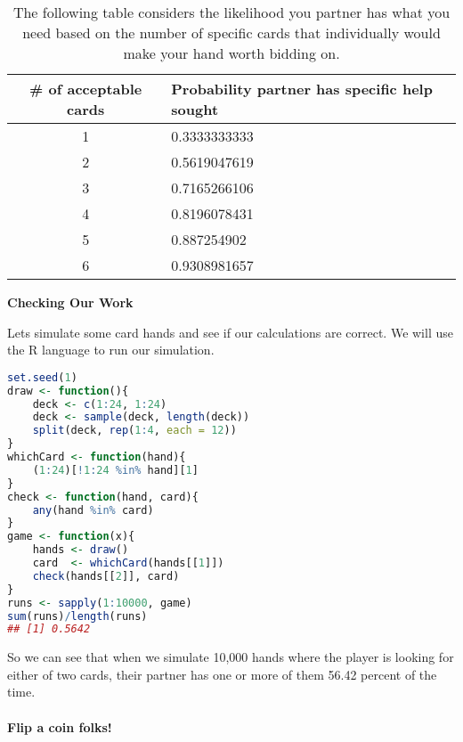 \documentclass[11pt]{article}
\begin{document}
\begin{table}[]
  \caption{The following table considers the likelihood you partner has what you need based on the number of specific cards that individually would make your hand worth bidding on.}
  \centering
\begin{tabular}{|c|l|}
\hline
\# of acceptable cards & Probability partner has specific help sought \\ \hline
1                      & 0.3333333333 \\ \hline
2                      & 0.5619047619 \\ \hline
3                      & 0.7165266106 \\ \hline
4                      & 0.8196078431 \\ \hline
5                      & 0.887254902  \\ \hline
6                      & 0.9308981657 \\ \hline
\end{tabular}
\end{table}

\begin{center}
  \textbf{Checking Our Work}
\end{center}
Lets simulate some card hands and see if our calculations are correct.
We will use the R language to run our simulation.
\begin{lstlisting}[language=R]
set.seed(1)
draw <- function(){
    deck <- c(1:24, 1:24)
    deck <- sample(deck, length(deck))
    split(deck, rep(1:4, each = 12))
}
whichCard <- function(hand){
    (1:24)[!1:24 %in% hand][1]
}
check <- function(hand, card){
    any(hand %in% card)
}
game <- function(x){
    hands <- draw()
    card  <- whichCard(hands[[1]])
    check(hands[[2]], card)
}
runs <- sapply(1:10000, game)
sum(runs)/length(runs)
## [1] 0.5642
\end{lstlisting}
So we can see that when we simulate 10,000 hands where the player is looking for either of two cards, their partner has one or more of them 56.42 percent of the time.\\
\\
\textbf{Flip a coin folks!}
\end{document}
